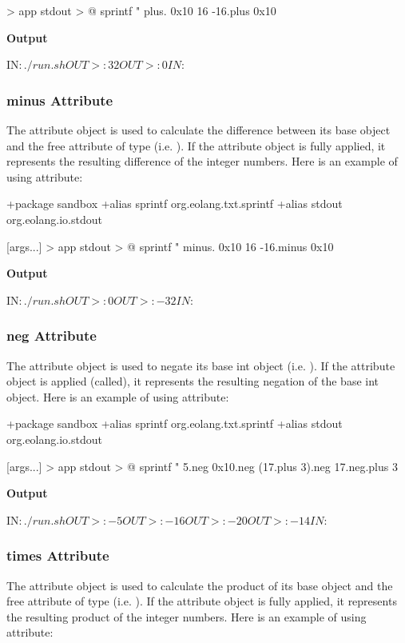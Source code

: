 \documentclass[12pt]{book}
\begin{document}
{\begin{ffcode}
[args...] > app
  stdout > @
    sprintf
      "%
      plus.
        0x10
        16
      -16.plus 0x10
\end{ffcode}
\textbf{Output} 
\begin{ffcode}
IN$: ./run.sh
OUT>: 32
OUT>: 0
IN$: 
\end{ffcode}

\subsubsection{minus Attribute}
The  attribute object is used to calculate the difference between its base  object and the free attribute  of type  (i.e. ).
If the  attribute object is fully applied, it represents the resulting difference of the integer numbers. Here is an example of using  attribute:

\begin{ffcode}
+package sandbox
+alias sprintf org.eolang.txt.sprintf
+alias stdout org.eolang.io.stdout

[args...] > app
  stdout > @
    sprintf
      "%
      minus.
        0x10
        16
      -16.minus 0x10
\end{ffcode}
\textbf{Output}
\begin{ffcode}
IN$: ./run.sh
OUT>: 0
OUT>: -32
IN$: 
\end{ffcode}

\subsubsection{neg Attribute}
The  attribute object is used to negate its base int object (i.e. \ff{-$}).
If the  attribute object is applied (called), it represents the resulting negation of the base int object. Here is an example of using  attribute:

\begin{ffcode}
+package sandbox
+alias sprintf org.eolang.txt.sprintf
+alias stdout org.eolang.io.stdout

[args...] > app
  stdout > @
    sprintf
      "%
      5.neg
      0x10.neg
      (17.plus 3).neg
      17.neg.plus 3
\end{ffcode}
\textbf{Output}
\begin{ffcode}
IN$: ./run.sh
OUT>: -5
OUT>: -16
OUT>: -20
OUT>: -14
IN$: 
\end{ffcode}

\subsubsection{times Attribute}
The  attribute object is used to calculate the product of its base  object and the free attribute  of type  (i.e. ).
If the  attribute object is fully applied, it represents the resulting product of the integer numbers. Here is an example of using  attribute:

}
\end{document}
